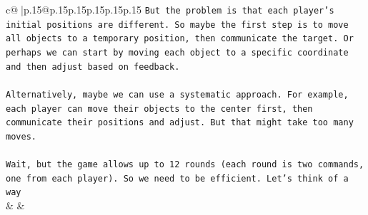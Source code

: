 \documentclass{article}
\begin{document}
{\begin{supertabular}{c@{$\;$}|p{.15\linewidth}@{}p{.15\linewidth}p{.15\linewidth}p{.15\linewidth}p{.15\linewidth}p{.15\linewidth}}
{{{\texttt{But the problem is that each player's initial positions are different. So maybe the first step is to move all objects to a temporary position, then communicate the target. Or perhaps we can start by moving each object to a specific coordinate and then adjust based on feedback.} \\
\\ 
\texttt{Alternatively, maybe we can use a systematic approach. For example, each player can move their objects to the center first, then communicate their positions and adjust. But that might take too many moves.} \\
\\ 
\texttt{Wait, but the game allows up to 12 rounds (each round is two commands, one from each player). So we need to be efficient. Let's think of a way} \\
            }
        }
    }
    & & \\ \\


\end{supertabular}}
\end{document}
